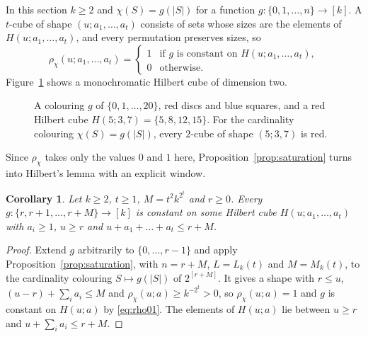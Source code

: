 \documentclass[11pt,reqno]{amsart}
\numberwithin{equation}{section}
\theoremstyle{plain}
\newtheorem{corollary}[theorem]{Corollary}
\theoremstyle{definition}
\theoremstyle{remark}
\begin{document}
In this section $k\ge2$ and $\chi(S)=g(|S|)$ for a function
$g:\{0,1,\dots,n\}\to[k]$. A $t$-cube of shape $(u;a_1,\dots,a_t)$
consists of sets whose sizes are the elements of $H(u;a_1,\dots,a_t)$, and
every permutation preserves sizes, so
\begin{equation}
\label{eq:rho01}
\rho_\chi(u;a_1,\dots,a_t)=
\begin{cases}1&\text{if $g$ is constant on }H(u;a_1,\dots,a_t),\\
0&\text{otherwise.}\end{cases}
\end{equation}
Figure~\ref{fig:hilbert} shows a monochromatic Hilbert cube of dimension
two.

\begin{figure}[t]
\centering

\caption{A colouring $g$ of $\{0,1,\dots,20\}$, red discs and blue
squares, and a red Hilbert cube $H(5;3,7)=\{5,8,12,15\}$. For the
cardinality colouring $\chi(S)=g(|S|)$, every $2$-cube of shape $(5;3,7)$
is red.}
\label{fig:hilbert}
\end{figure}

Since $\rho_\chi$ takes only the values $0$ and $1$ here,
Proposition~\ref{prop:saturation} turns into Hilbert's lemma with an
explicit window.

\begin{corollary}
\label{cor:hilbertlemma}
Let $k\ge2$, $t\ge1$, $M=t^{2}k^{2^{t}}$ and $r\ge0$. Every
$g:\{r,r+1,\dots,r+M\}\to[k]$ is constant on some Hilbert cube
$H(u;a_1,\dots,a_t)$ with $a_i\ge1$, $u\ge r$ and $u+a_1+\dots+a_t\le
r+M$.
\end{corollary}

\begin{proof}
Extend $g$ arbitrarily to $\{0,\dots,r-1\}$ and apply
Proposition~\ref{prop:saturation}, with $n=r+M$, $L=L_k(t)$ and
$M=M_k(t)$, to the cardinality colouring $S\mapsto g(|S|)$ of
$2^{[r+M]}$. It gives a shape with $r\le u$, $(u-r)+\sum_ia_i\le M$ and
$\rho_\chi(u;a)\ge k^{-2^{t}}>0$, so $\rho_\chi(u;a)=1$ and $g$ is
constant on $H(u;a)$ by \eqref{eq:rho01}. The elements of $H(u;a)$ lie
between $u\ge r$ and $u+\sum_ia_i\le r+M$.
\end{proof}
\end{document}
